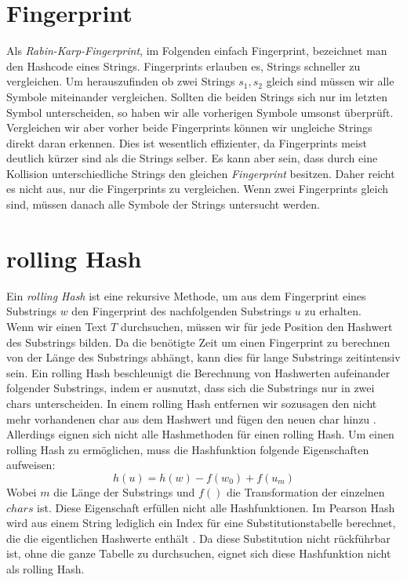 \section{Fingerprint}
Als \textit{Rabin-Karp-Fingerprint}, im Folgenden einfach Fingerprint, bezeichnet man den Hashcode eines Strings.
Fingerprints erlauben es, Strings schneller zu vergleichen.
Um herauszufinden ob zwei Strings $s_{1}, s_{2}$ gleich sind müssen wir alle Symbole miteinander vergleichen.
Sollten die beiden Strings sich nur im letzten Symbol unterscheiden, so haben wir alle vorherigen Symbole umsonst überprüft.\\
Vergleichen wir aber vorher beide Fingerprints können wir ungleiche Strings direkt daran erkennen. Dies ist wesentlich effizienter, da Fingerprints meist deutlich kürzer sind als die Strings selber.
Es kann aber sein, dass durch eine Kollision unterschiedliche Strings den gleichen \textit{Fingerprint} besitzen.
Daher reicht es nicht aus, nur die Fingerprints zu vergleichen.
Wenn  zwei Fingerprints gleich sind, müssen danach alle Symbole der Strings untersucht werden\cite{Karp1987}\cite{joyhash}.

\section{rolling Hash}
Ein \textit{rolling Hash} ist eine rekursive Methode, um aus dem Fingerprint eines Substrings $w$ den Fingerprint des nachfolgenden Substrings $u$ zu erhalten.\\
Wenn wir einen Text $T$ durchsuchen, müssen wir für jede Position den Hashwert des Substrings bilden. Da die benötigte Zeit um einen Fingerprint zu berechnen von der Länge des Substrings abhängt, kann dies für lange Substrings zeitintensiv sein. Ein rolling Hash beschleunigt die Berechnung von Hashwerten aufeinander folgender Substrings, indem er ausnutzt, dass sich die Substrings nur in zwei chars unterscheiden. In einem rolling Hash entfernen wir sozusagen den nicht mehr vorhandenen char aus dem Hashwert und fügen den neuen char hinzu \cite{Karp1987}.\\
Allerdings eignen sich nicht alle Hashmethoden für einen rolling Hash. Um einen rolling Hash zu ermöglichen, muss die Hashfunktion folgende Eigenschaften aufweisen:
\begin{equation}\nonumber
	h(u)=h(w)-f(w_{0})+f(u_{m})
\end{equation}
\noindent
Wobei $m$ die Länge der Substrings und $f()$ die Transformation der einzelnen $chars$ ist. Diese Eigenschaft erfüllen nicht alle Hashfunktionen. Im Pearson Hash wird aus einem String lediglich ein Index für eine Substitutionstabelle berechnet, die die eigentlichen Hash\-werte enthält \cite{pearsonhash}. Da diese Substitution nicht rückführbar ist, ohne die ganze Tabelle zu durchsuchen, eignet sich diese Hashfunktion nicht als rolling Hash.\\

